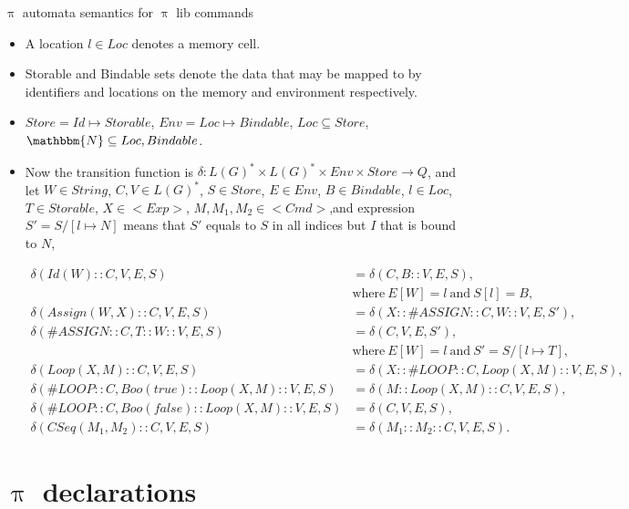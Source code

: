 \documentclass{beamer}
\begin{document}

\begin{frame}{{\color{red}$\uppi$ automata} semantics for {\color{red}$\uppi$ lib} commands}
\begin{itemize}
\item A location $l \in Loc$ denotes a memory cell.
\item Storable and Bindable sets denote the data that may be mapped to by identifiers and locations on the memory and environment respectively. 
\item $Store = Id \mapsto Storable$, $Env = Loc \mapsto Bindable$, $Loc \subseteq Store$, $\mathbbm{N} \subseteq Loc, Bindable$.
\item Now the transition function is $\delta : L(G)^* \times L(G)^* \times Env \times Store \to Q$, and let $W \in String$,  $C, V \in L(G)^*$, $S \in \mathit{Store}$, $E \in Env$, $B \in \mathit{Bindable}$, $l \in Loc$, $T \in \mathit{Storable}$, $X \in <Exp>$, $M, M_1, M_2 \in <Cmd>$,and expression $S' = S/[l \mapsto N]$ means that $S'$ equals to $S$ in all indices but $I$ that is bound to $N$,
\begin{tiny}
\begin{align}
\delta(Id(W) :: C, V, E, S) & = \delta(C, B :: V, E, S), \\ & \text{where}~ E[W] = l ~\text{and}~ S[l] = B,\nonumber \\
%
\delta(Assign(W, X) :: C, V, E, S) & =  \delta(X :: \#ASSIGN :: C, W :: V, E, S'), \\
\delta(\#ASSIGN :: C, T :: W :: V, E, S) & = \delta(C, V, E, S'), & \\ & \text{where}~ E[W] = l ~\text{and}~ S' = S/[l \mapsto T], \nonumber \\
%
\delta(Loop(X, M) :: C, V, E, S) & =  \delta(X :: \#LOOP :: C, Loop(X, M) :: V, E, S),  \\
\delta(\#LOOP :: C, Boo(true) :: Loop(X, M) :: V, E, S) & = \delta(M :: Loop(X, M) :: C, V, E, S),  \\
\delta(\#LOOP :: C, Boo(false) :: Loop(X, M) :: V, E, S) & = \delta(C, V, E, S), \\
%
\delta(CSeq(M_1, M_2) :: C, V, E, S) & = \delta(M_1 :: M_2 :: C, V, E, S).
\end{align}
\end{tiny}
\end{itemize}
\end{frame}

\section{$\uppi$ declarations}
\end{document}
